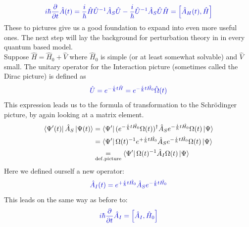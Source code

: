 \documentclass[12pt, titlepage]{article}
\begin{document}
\begin{equation}\label{eq:Heisenberg_time_dep._eq.}
\textcolor[RGB]{0,0,204}{
i\hbar\frac{\partial}{\partial t}\hat{A}(t)=
\frac{i}{\hbar}\hat{H}
\hat{U}^{-1}
\hat{A}_{S}
\hat{U}
-
\frac{i}{\hbar}
\hat{U}^{-1}
\hat{A}_{S}
\hat{U}
\hat{H}
=\left[ \hat{A}_{H}(t),\hat{H}\right] 
}
\end{equation}
These to pictures give us a good foundation to expand into even more useful ones. The next step will lay the background for perturbation theory in in every quantum based model.\\
Suppose $ \hat{H}=\hat{H}_{0}+\hat{V} $ where $ \hat{H}_{0} $ is simple (or at least somewhat solvable) and $ \hat{V} $
small.
The unitary operator for the Interaction picture (sometimes called the Dirac picture) is defined as 
\begin{equation}\label{eq:omega_and_U}
\textcolor[RGB]{0,0,204}{
\hat{U}=e^{-\frac{i}{\hbar}t \hat{H}}
=
e^{-\frac{i}{\hbar}t \hat{H_{0}}}
\hat{\Omega} (t)
}
\end{equation}
This expression leads us to the formula of transformation to the Schrödinger picture, by again looking at a matrix element.\\
\begin{subequations}
\begin{align}
	\bra{\Psi^{\prime}(t)}
	\hat{A}_{S}
	\ket{\Psi(t)}
  		&= 	\bra{\Psi^{\prime}}
			(e^{-\frac{i}{\hbar}t \hat{H_{0}}}	
			\Omega (t))^{\dagger}
			\hat{A}_{S}
			e^{-\frac{i}{\hbar}t \hat{H_{0}}}
			\Omega (t)
			\ket{\Psi}
  		\\
  		&= \bra{\Psi^{\prime}}
  			\Omega(t)^{-1}
			e^{+\frac{i}{\hbar}t \hat{H_{0}}}	
			\hat{A}_{S}
			e^{-\frac{i}{\hbar}t \hat{H_{0}}}
			\Omega (t)
			\ket{\Psi}
  		\\
  		&\underset{\mathrm{def.picture}}{=}
  			\bra{\Psi^{\prime}}
  			\Omega(t)^{-1}
			\hat{A}_{I}
			\Omega (t)
			\ket{\Psi}  		
\end{align}
\end{subequations}
Here we defined ourself a new operator:
\begin{equation}\label{eq:operator_interac_schrodinger}
\textcolor[RGB]{0,0,204}{
	\hat{A}_{I}(t)
	=
	e^{+\frac{i}{\hbar}t \hat{H_{0}}}
	\hat{A}_{S}
	e^{-\frac{i}{\hbar}t \hat{H_{0}}}	
}
\end{equation}
This leads on the same way as before to:
\begin{equation}\label{eq:time_evo_equ_Intera}
\textcolor[RGB]{0,0,204}{
	i\hbar
	\frac{\partial}{\partial t}
	\hat{A}_{I}
	=
	\left[ 
	\hat{A}_{I},
	\hat{H}_{0}
	\right] 
}
\end{equation}
\end{document}
